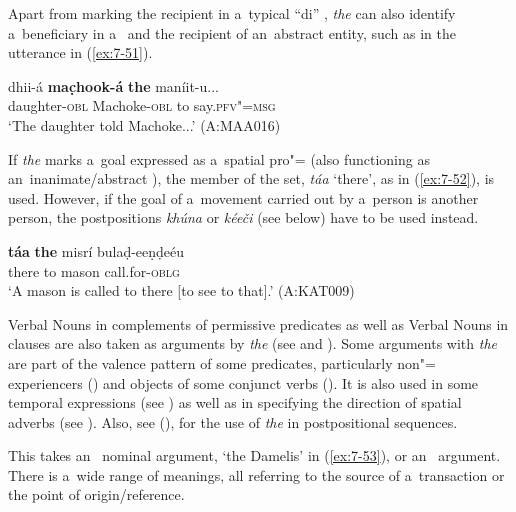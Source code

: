 Apart from marking the recipient in a~typical ``di'' , \textit{the} can also identify a~beneficiary in a~  and the recipient of an~abstract entity, such as in the utterance in (\ref{ex:7-51}). 

\begin{exe}
\ex
\label{ex:7-51}
\gll dhii-á \textbf{mac̣hook-á} \textbf{the} maníit-u... \\
daughter-\textsc{obl} Machoke-\textsc{obl} to say.\textsc{pfv"=msg} \\
\glt `The daughter told Machoke...' (A:MAA016)
\end{exe}

If \textit{the} marks a~goal expressed as a~spatial pro"= (also functioning as an~inanimate/abstract  ), the  member of the set, \textit{táa} `there', as in (\ref{ex:7-52}), is used. However, if the goal of a~movement carried out by a~person is another person, the postpositions \textit{khúna} or \textit{kéeči} (see below) have to be used instead.


\begin{exe}
\ex
\label{ex:7-52}
\gll \textbf{táa} \textbf{the} misrí bulaḍ-eeṇḍeéu \\
there to mason call.for-\textsc{oblg}\\
\glt `A mason is called to there [to see to that].' (A:KAT009)
\end{exe}


Verbal Nouns in complements of permissive predicates as well as Verbal Nouns in  clauses are also taken as arguments by \textit{the} (see  and ). Some arguments with \textit{the} are part of the valence pattern of some predicates, particularly non"= experiencers () and objects of some conjunct verbs (). It is also used in some temporal expressions (see ) as well as in specifying the direction of spatial adverbs (see ). Also, see (), for the use of \textit{the} in postpositional sequences. 


 This  takes an~ nominal argument, `the Damelis' in (\ref{ex:7-53}), or an~  argument. There is a~wide range of meanings, all referring to the source of a~transaction or the point of origin/reference.

